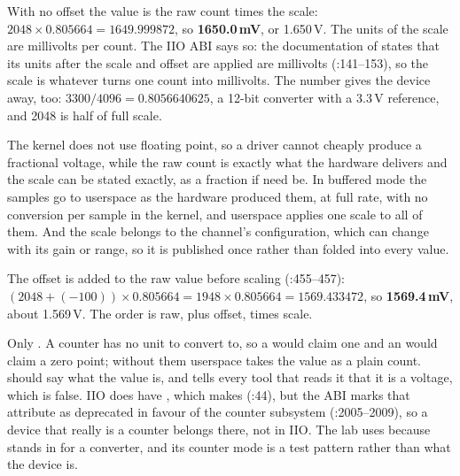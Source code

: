  With no offset the value is the raw count times the scale:
$2048 \times 0.805664 = 1649.999872$, so \textbf{1650.0\,mV}, or 1.650\,V. The units of the scale
are millivolts per count. The IIO ABI says so: the documentation of  states
that its units after the scale and offset are applied are millivolts
(:141--153), so the scale is whatever turns one count
into millivolts. The number gives the device away, too: $3300 / 4096 = 0.8056640625$, a 12-bit
converter with a 3.3\,V reference, and 2048 is half of full scale.

 The kernel does not use floating point, so a driver cannot cheaply produce a fractional
voltage, while the raw count is exactly what the hardware delivers and the scale can be stated
exactly, as a fraction if need be. In buffered mode the samples go to userspace as the hardware
produced them, at full rate, with no conversion per sample in the kernel, and userspace applies
one scale to all of them. And the scale belongs to the channel's configuration, which can change
with its gain or range, so it is published once rather than folded into every value.

 The offset is added to the raw value before scaling
(:455--457):
$(2048 + (-100)) \times 0.805664 = 1948 \times 0.805664 = 1569.433472$, so \textbf{1569.4\,mV},
about 1.569\,V. The order is raw, plus offset, times scale.

 Only . A counter has no unit to convert to, so a  would claim one and
an  would claim a zero point; without them userspace takes the value as a plain count.
 should say what the value is, and  tells every tool that reads it that
it is a voltage, which is false. IIO does have , which makes 
(:44), but the ABI marks that attribute as deprecated in favour
of the counter subsystem (:2005--2009), so a device
that really is a counter belongs there, not in IIO. The lab uses  because
 stands in for a converter, and its counter mode is a test pattern rather than what the
device is.


